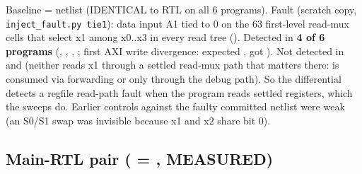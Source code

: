 \begin{record}

Baseline =  netlist (IDENTICAL to RTL on all 6
programs). Fault (scratch copy,
\texttt{inject\_\allowbreak{}fault.\allowbreak{}py\ tie1}): data input
A1 tied to 0 on the 63 first-level read-mux cells that select x1 among
x0..x3 in every read tree (). Detected in
\textbf{4 of 6 programs} (, ,
, ; first AXI write divergence: expected
, got ). Not detected in
 and  (neither reads x1 through a
settled read-mux path that matters there:  is consumed via
forwarding or only through the debug path). So the differential detects
a regfile read-path fault when the program reads settled registers,
which the sweeps do. Earlier controls against the faulty committed
netlist were weak (an S0/S1 swap was invisible because x1 and x2 share
bit 0).

\end{record}

\subsection{\texorpdfstring{Main-RTL pair ( =
, MEASURED)}{Main-RTL pair ( = , MEASURED)}}\label{cr:defect:sky130-cpu-synlig-dud4:main-rtl-pair-originmain-5eb5f63-measured}

